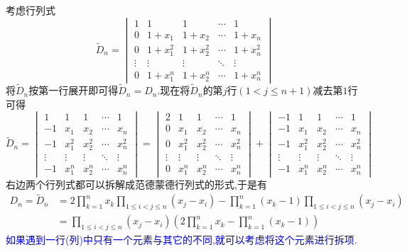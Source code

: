 \documentclass{ctexart}
\begin{document}
\begin{solution}
    考虑行列式
    \[\tilde{D}_{n}=\begin{vmatrix}
        1&1&1&\cdots&1\\
        0&1+x_1&1+x_2&\cdots&1+x_n\\
        0&1+x_1^2&1+x_2^2&\cdots&1+x_n^2\\
        \vdots&\vdots&\vdots&\ddots&\vdots\\
        0&1+x_1^n&1+x_2^n&\cdots&1+x_n^n
    \end{vmatrix}\]
    将$\tilde{D}_n$按第一行展开即可得$\tilde{D}_n=D_n$.现在将$\tilde{D}_n$的第$j$行$(1<j\leqslant n+1)$减去第$1$行可得
    \[\tilde{D}_n=\begin{vmatrix}
        1&1&1&\cdots&1\\
        -1&x_1&x_2&\cdots&x_n\\
        -1&x_1^2&x_2^2&\cdots&x_n^2\\
        \vdots&\vdots&\vdots&\ddots&\vdots\\
        -1&x_1^n&x_2^n&\cdots&x_n^n
    \end{vmatrix}=\begin{vmatrix}
        2&1&1&\cdots&1\\
        0&x_1&x_2&\cdots&x_n\\
        0&x_1^2&x_2^2&\cdots&x_n^2\\
        \vdots&\vdots&\vdots&\ddots&\vdots\\
        0&x_1^n&x_2^n&\cdots&x_n^n
    \end{vmatrix}+\begin{vmatrix}
        -1&1&1&\cdots&1\\
        -1&x_1&x_2&\cdots&x_n\\
        -1&x_1^2&x_2^2&\cdots&x_n^2\\
        \vdots&\vdots&\vdots&\ddots&\vdots\\
        -1&x_1^n&x_2^n&\cdots&x_n^n
    \end{vmatrix}\]
    右边两个行列式都可以拆解成范德蒙德行列式的形式,于是有
    \[\begin{aligned}
        D_n=\tilde{D}_n
        &= 2\prod_{k=1}^{n}x_k\prod_{1\leqslant i<j\leqslant n}\left(x_j-x_i\right)-\prod_{k=1}^{n}\left(x_k-1\right)\prod_{1\leqslant i<j\leqslant n}\left(x_j-x_i\right) \\
        &= \prod_{1\leqslant i<j\leqslant n}\left(x_j-x_i\right)\left(2\prod_{k=1}^{n}x_k-\prod_{k=1}^{n}\left(x_k-1\right)\right)
    \end{aligned}\]
    \textcolor{blue}{如果遇到一行(列)中只有一个元素与其它的不同,就可以考虑将这个元素进行拆项.}
\end{solution}
\end{document}
